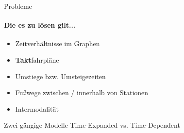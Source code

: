 \begin{frame}{Probleme}
	\framesubtitle{Die es zu lösen gilt...}
	\begin{itemize}
		\item Zeitverhältnisse im Graphen \pause
		\item \textbf{Takt}fahrpläne \pause
		\item Umstiege bzw. Umsteigezeiten \pause		
		\item Fußwege zwischen / innerhalb von Stationen \pause
		\item \sout{Intermodalität}
	\end{itemize}
	
	\vspace{6em}
	\begin{block}{Zwei gängige Modelle}
		Time-Expanded vs. Time-Dependent
	\end{block}
\end{frame}




















